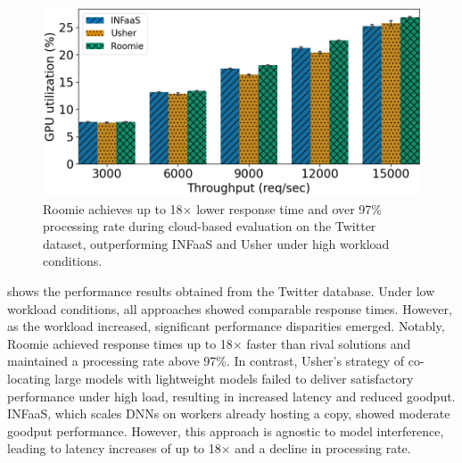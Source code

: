 \begin{figure}
\begin{minipage}[t]{.24\textwidth}
	\end{minipage}
	\hfill
	\begin{minipage}[t]{.24\textwidth}
		\centering
		\includegraphics[width=\textwidth]{chapters/roomie/images/NvidiaA100/twitter-all-models/gpu_utilization.png}
	\end{minipage}
	\caption{Roomie achieves up to 18× lower response time and over 97\% processing rate during cloud-based evaluation on the Twitter dataset, outperforming INFaaS and Usher under high workload conditions.}
	\label{fig:NvidiaA100/twitter-all-models}
	\vspace{-3mm}
\end{figure}

 shows the performance results obtained from the Twitter database. Under low workload conditions, all approaches showed comparable response times. However, as the workload increased, significant performance disparities emerged. Notably, Roomie achieved response times up to 18× faster than rival solutions and maintained a processing rate above 97\%. In contrast, Usher's strategy of co-locating large models with lightweight models failed to deliver satisfactory performance under high load, resulting in increased latency and reduced goodput. INFaaS, which scales DNNs on workers already hosting a copy, showed moderate goodput performance. However, this approach is agnostic to model interference, leading to latency increases of up to 18× and a decline in processing rate.

